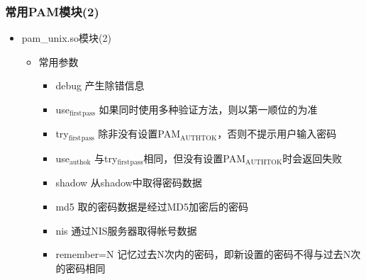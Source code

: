 \documentclass[xcolor=svgnames,presentation]{beamer}
\begin{document}
\begin{frame}
\frametitle{常用PAM模块(2)}
\label{sec-6-11}
\begin{itemize}

\item pam\_unix.so模块(2)
\label{sec-6-11-1}%
\begin{itemize}

\item 常用参数
\label{sec-6-11-1-1}%
\begin{itemize}

\item debug 产生除错信息
\label{sec-6-11-1-1-1}%

\item use$_{\mathrm{first}}$$_{\mathrm{pass}}$ 如果同时使用多种验证方法，则以第一顺位的为准
\label{sec-6-11-1-1-2}%

\item try$_{\mathrm{first}}$$_{\mathrm{pass}}$ 除非没有设置PAM$_{\mathrm{AUTHTOK}}$，否则不提示用户输入密码
\label{sec-6-11-1-1-3}%

\item use$_{\mathrm{authok}}$ 与try$_{\mathrm{first}}$$_{\mathrm{pass}}$相同，但没有设置PAM$_{\mathrm{AUTHTOK}}$时会返回失败
\label{sec-6-11-1-1-4}%

\item shadow 从shadow中取得密码数据
\label{sec-6-11-1-1-5}%

\item md5 取的密码数据是经过MD5加密后的密码
\label{sec-6-11-1-1-6}%

\item nis 通过NIS服务器取得帐号数据
\label{sec-6-11-1-1-7}%

\item remember=N 记忆过去N次内的密码，即新设置的密码不得与过去N次的密码相同
\label{sec-6-11-1-1-8}%
\end{itemize} %
\end{itemize} %
\end{itemize} %
\end{frame}
\end{document}
